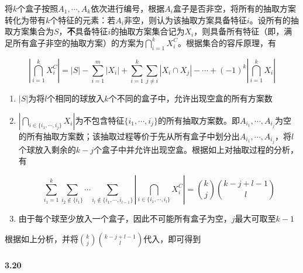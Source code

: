 \documentclass{../notes}
\begin{document}
\begin{subquestions}
        将$k$个盒子按照$A_1, \cdots, A_k$依次进行编号，根据$A_i$盒子是否非空，将所有的抽取方案转化为带有$k$个特征的元素：若$A_i$非空，则认为该抽取方案具备特征$i$。设所有的抽取方案集合为$S$，\textbf{不}具备特征$i$的抽取方案集合记为$X_i$，则具备所有特征（即，满足所有盒子非空的抽取方案）的方案为$\bigcap_{i=1}^k X_i^C$。根据集合的容斥原理，有

        \begin{equation}
            \left|\bigcap_{i=1}^kX_i^C\right| = |S| - \sum_{i=1}^m\left|X_i\right| + \sum_{i=1}^k\sum_{j\not = i}\left|X_i\cap X_j\right| - \cdots + (-1)^k\left|\bigcap_{i=1}^k X_i\right|
            \label{eq:3.4.4}
        \end{equation}

        \begin{enumerate}
            \item $|S|$为将$l$个相同的球放入$k$个不同的盒子中，允许出现空盒的所有方案数
            \item $\left|\bigcap_{i\in\{i_1, \cdots, i_j\}}X_i\right|$为不包含特征$\{i_1, \cdots, i_j\}$的所有抽取方案数。即$A_{i_1}, \cdots, A_{i_j}$为空的所有抽取方案数；该抽取过程等价于先从所有盒子中划分出$A_{i_1}, \cdots, A_{i_j}$，将$l$个球放入剩余的$k-j$个盒子中并允许出现空盒。根据如上对抽取过程的分析，有

            \begin{equation*}
                \sum_{i_{1}=1}^k\sum_{i_{2}\not\in \{i_1\}}\cdots\sum_{i_{l}\not\in \{i_1, \cdots, i_{l-1}\}}\left|\bigcap_{i\in\{i_1, \cdots, i_l\}} X_i^C\right| = \binom{k}{j}\binom{k-j+l-1}{l}
            \end{equation*}

            \item 由于每个球至少放入一个盒子，因此不可能所有盒子为空，$j$最大可取至$k-1$
        \end{enumerate}

        根据如上分析，并将$\binom{k}{j}\binom{k-j+l-1}{l}$代入，即可得到

    \end{subquestions}

    \paragraph*{3.20}
\end{document}
